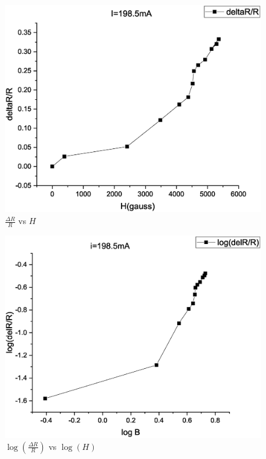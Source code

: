 
\begin{figure}[]
    \centering
    \includegraphics[width=0.95\columnwidth]{images/Graph1.eps}
    \caption{$\frac{\Delta R}{R}$ vs $H$}
    \label{fig:graph1}
\end{figure}
\begin{figure}[]
    \centering
    \includegraphics[width=0.95\columnwidth]{images/Graph2.eps}
    \caption{$\log (\frac{\Delta R}{R})$  vs $\log(H)$}
    \label{fig:graph2}
\end{figure}




